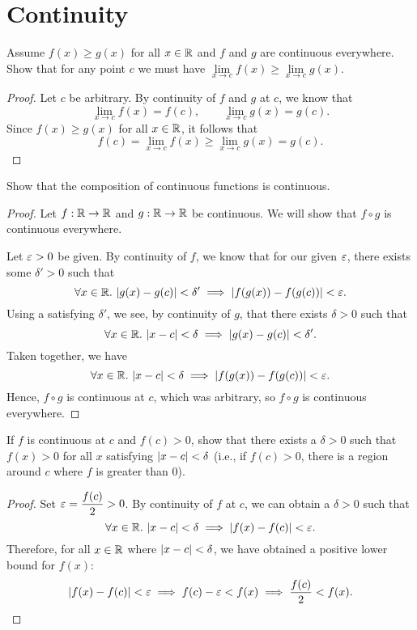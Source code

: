 \section{Continuity}

\begin{problem}
  Assume $f(x) \geq g(x)$ for all $x \in \mathbb{R}$ and $f$ and $g$ are continuous
  everywhere. Show that for any point $c$ we must have $\lim\limits_{x \to c}
  f(x) \geq \lim\limits_{x \to c} g(x)$.

  \begin{proof}
    Let $c$ be arbitrary. By continuity of $f$ and $g$ at $c$, we know that 
    \[
      \lim\limits_{x \to c} f(x) = f(c), \qquad \lim\limits_{x \to c} g(x) = g(c).
    \] 
    Since $f(x) \geq g(x)$ for all $x \in \mathbb{R}$, it follows that 
    \[
      f(c) = \lim\limits_{x \to c} f(x) \geq \lim\limits_{x \to c} g(x) = g(c).
    \]
  \end{proof}

\end{problem}

\begin{problem}
  Show that the composition of continuous functions is continuous.

  \begin{proof}
    Let $f : \mathbb{R} \to \mathbb{R}$ and $g : \mathbb{R} \to \mathbb{R}$ be continuous. We will show that
    $f \circ g$ is continuous everywhere.

    Let $\varepsilon > 0$ be given. By continuity of $f$, we know that for our given $\varepsilon$,
    there exists some $\delta' > 0$ such that
    \[
      \forall x \in \mathbb{R}.\, \left\lvert g(x) - g(c) \right\rvert < \delta' \implies \left\lvert f(g(x)) - f(g(c)) \right\rvert < \varepsilon.
    \]
    Using a satisfying $\delta'$, we see, by continuity of $g$, that there
    exists $\delta > 0$ such that
    \[
      \forall x \in \mathbb{R}.\, \left\lvert x - c \right\rvert < \delta \implies \left\lvert g(x) - g(c) \right\rvert < \delta'.
    \]
    Taken together, we have
    \[
      \forall x \in \mathbb{R}.\, \left\lvert x - c \right\rvert < \delta \implies \left\lvert f(g(x)) - f(g(c)) \right\rvert < \varepsilon.
    \]
    Hence, $f \circ g$ is continuous at $c$, which was arbitrary, so $f \circ
    g$ is continuous everywhere.
  \end{proof}

\end{problem}

\begin{problem}
  If $f$ is continuous at $c$ and $f(c) > 0$, show that there exists a $\delta > 0$ such that $f(x) > 0$ for all
  $x$ satisfying $\left\lvert x - c \right\rvert < \delta$ (i.e., if $f(c) > 0$, there is a region around $c$ where $f$ is greater than $0$).

  \begin{proof}
    Set $\varepsilon = \dfrac{f(c)}{2} > 0$. By continuity of $f$ at $c$, we can obtain a $\delta > 0$ such that
    \[
      \forall x \in \mathbb{R}.\, \left\lvert x - c \right\rvert < \delta \implies \left\lvert f(x) - f(c) \right\rvert < \varepsilon.
    \]
    Therefore, for all $x \in \mathbb{R}$ where $\left\lvert x - c \right\rvert < \delta$, we have obtained a positive lower bound for $f(x)$:
    \[
      \left\lvert f(x) - f(c) \right\rvert < \varepsilon \implies f(c) - \varepsilon < f(x) \implies \frac{f(c)}{2} < f(x).
    \]
  \end{proof}

\end{problem}

